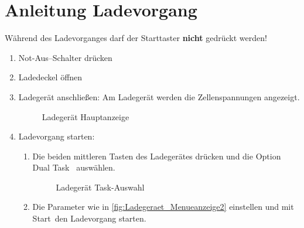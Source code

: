 \clearpage
\section{Anleitung Ladevorgang\label{sec:Anleitung_Laden}}
Während des Ladevorganges darf der Starttaster \textbf{nicht} gedrückt werden!
\begin{enumerate}
    \item Not-Aus--Schalter drücken
    \item Ladedeckel öffnen
    \item Ladegerät anschließen: Am Ladegerät werden die Zellenspannungen angezeigt.
    \begin{figure}[H]
        \centering
        \caption{Ladegerät Hauptanzeige \label{fig:Ladegeraet_Hauptanzeige}}
    \end{figure}
    \newpage
    \item Ladevorgang starten:
    \begin{enumerate}
        \item Die beiden mittleren Tasten des Ladegerätes drücken und die Option \glqq Dual Task \grqq\ auswählen.
        \begin{figure}[H]
            \centering
            \caption{Ladegerät Task-Auswahl \label{fig:Ladegeraet_Menueanzeige}}
        \end{figure}
        \item Die Parameter wie in \autoref{fig:Ladegeraet_Menueanzeige2} einstellen und mit \glqq Start\grqq\ den Ladevorgang starten.

\end{enumerate}
\end{enumerate}
